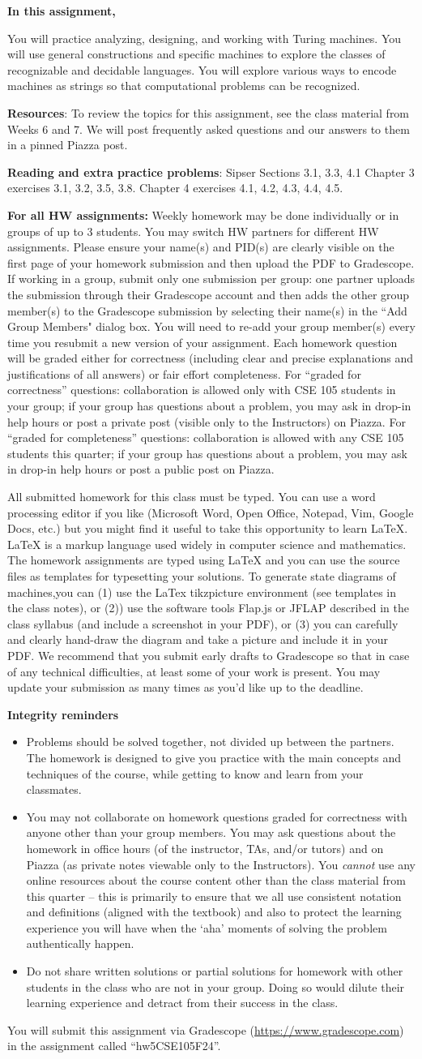 \documentclass[12pt, oneside]{article}
\newcommand{\instructions}{{\bf For all HW assignments:} Weekly homework 
may be done individually or in groups of up to 3 students. 
You may switch HW partners for different HW assignments. 
Please ensure your name(s) and PID(s) are clearly visible on the first page of your homework submission 
and then upload the PDF to Gradescope. If working in a group, submit only one submission per group: 
one partner uploads the submission through their Gradescope account and then adds the other group member(s) 
to the Gradescope submission by selecting their name(s) in the ``Add Group Members" dialog box. 
You will need to re-add your group member(s) every time you resubmit a new version of your assignment.
 Each homework question will be graded either for correctness (including clear and precise explanations and 
 justifications of all answers) or fair effort completeness. 
 For ``graded for correctness''
 questions: collaboration is allowed only with CSE 105 students in your group; 
 if your group has questions about a problem, you may ask in drop-in 
 help hours or post a private post (visible only to the Instructors) on Piazza.
 For ``graded for completeness''
 questions: collaboration is allowed with any CSE 105 students this quarter; 
 if your group has questions about a problem, you may ask in drop-in 
 help hours or post a public post on Piazza.

All submitted homework for this class must be typed. 
You can use a word processing editor if you like (Microsoft Word, Open Office, Notepad, Vim, Google Docs, etc.) 
but you might find it useful to take this opportunity to learn LaTeX. 
LaTeX is a markup language used widely in computer science and mathematics. 
The homework assignments are typed using LaTeX and you can use the source files 
as templates for typesetting your solutions.
To generate state diagrams of machines,you can (1) use the LaTex tikzpicture
environment (see templates in the class notes), or (2)) use the software tools Flap.js or
JFLAP described in the class syllabus (and include a screenshot in your PDF), or (3) you can carefully
and clearly hand-draw
the diagram and take a picture and include it in your PDF.
We recommend that you
submit early drafts to Gradescope so that in case of any technical difficulties, at least some of your
work is present. You may update your submission as many times as you'd like up to the deadline.


{\bf Integrity reminders}
\begin{itemize}
\item Problems should be solved together, not divided up between the partners. The homework is
designed to give you practice with the main concepts and techniques of the course, 
while getting to know and learn from your classmates.
\item You may not collaborate on homework questions graded for correctness with anyone other than your group members.
You may ask questions about the homework in office hours (of the instructor, TAs, and/or tutors) and 
on Piazza (as private notes viewable only to the Instructors).  
You \emph{cannot} use any online resources about the course content other than the class material 
from this quarter -- this is primarily to ensure that we all use consistent notation and
definitions (aligned with the textbook) and also to protect the learning experience you will have when
the `aha' moments of solving the problem authentically happen.
\item Do not share written solutions or partial solutions for homework with 
other students in the class who are not in your group. Doing so would dilute their learning 
experience and detract from their success in the class.
\end{itemize}

}
\begin{document}
{\bf In this assignment,}

You will  practice analyzing, designing, and working with Turing machines.
You will use general constructions and specific machines to explore the classes 
of recognizable and decidable languages. 
You will explore various ways to encode machines as strings so that 
computational problems can be recognized.

{\bf Resources}: To review the topics 
for this assignment, see the class material from Weeks 6 and 7.
We will post frequently asked questions and our answers to them in a 
pinned Piazza post. 

{\bf Reading and extra practice problems}:  
Sipser Sections 3.1, 3.3, 4.1
Chapter 3 exercises 3.1, 3.2, 3.5, 3.8.
Chapter 4 exercises 4.1, 4.2, 4.3, 4.4, 4.5.

\instructions

You will submit this assignment via Gradescope
(\href{https://www.gradescope.com}{https://www.gradescope.com}) 
in the assignment called ``hw5CSE105F24''.
\end{document}
